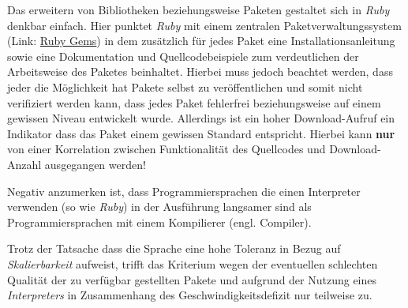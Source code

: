 \documentclass[12pt,DIV=14, version=first, BCOR=10mm,a4paper,twoside,parskip=half-,headsepline,headinclude]{scrartcl}
\begin{document}
\begin{flushleft}
Das erweitern von Bibliotheken beziehungsweise Paketen gestaltet sich in \textit{\glqq Ruby\grqq} denkbar einfach. Hier punktet \textit{\glqq Ruby\grqq} mit einem zentralen Paketverwaltungssystem (Link: \href {https://rubygems.org/} {Ruby Gems})  in dem zusätzlich für jedes Paket eine Installationsanleitung sowie eine Dokumentation und Quellcodebeispiele zum verdeutlichen der Arbeitsweise des Paketes beinhaltet. Hierbei muss jedoch beachtet werden, dass jeder die Möglichkeit hat Pakete selbst zu veröffentlichen und somit nicht verifiziert werden kann, dass jedes Paket fehlerfrei beziehungsweise auf einem gewissen Niveau entwickelt wurde. Allerdings ist ein hoher Download-Aufruf ein Indikator dass das Paket einem gewissen Standard entspricht. Hierbei kann \textbf{nur} von einer Korrelation zwischen Funktionalität des Quellcodes und Download-Anzahl ausgegangen werden!

Negativ anzumerken ist, dass Programmiersprachen die einen Interpreter verwenden (so wie \textit{\glqq Ruby\grqq}) in der Ausführung langsamer sind als Programmiersprachen mit einem Kompilierer (engl. Compiler).

Trotz der Tatsache dass die Sprache eine hohe Toleranz in Bezug auf \textit{Skalierbarkeit} aufweist, trifft das Kriterium wegen der eventuellen schlechten Qualität der zu verfügbar gestellten Pakete und aufgrund der Nutzung eines \textit{Interpreters} in Zusammenhang des Geschwindigkeitsdefizit nur teilweise zu.

\end{flushleft}
\end{document}
